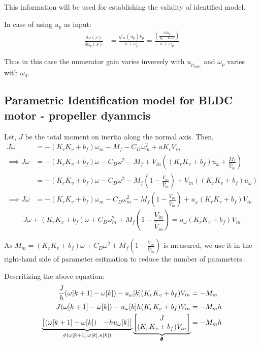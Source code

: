 This information will be used for establishing the validity of identified model.

In case of using $u_p$ as input:
\begin{align*}
    \frac{\delta \omega(s)}{\delta u_p(s)} &= \frac{g'_w (u_p) k_p}{s + \omega_p} = \frac{\left(\frac{22 k_p}{u_p - 1110}\right)}{s + \omega_p}
\end{align*}

Thus in this case the numerator gain varies inversely with $u_{p_{nom}}$ and $\omega_p$ varies with $\omega_0$.

\subsection{Parametric Identification model for BLDC motor - propeller dyanmcis}
Let, $J$ be the total moment on inertia along the normal axis. Then,
\begin{align*}
    J \dot \omega &= -(K_rK_v + b_f) \omega_m - M_f - C_D \omega_m^2 + u K_r V_{in}\\
    \implies J\dot \omega &= -(K_rK_v + b_f) \omega - C_D \omega^2 - M_f + V_{in} \left((K_r K_v  + b_f) u_\omega + \frac{M_f}{\hat V_{in}} \right)\\
        &= -(K_rK_v + b_f) \omega - C_D \omega^2 - M_f \left( 1 - \frac{V_{in}}{\hat V_{in}}\right) + V_{in} \left((K_r K_v  + b_f) u_\omega  \right)\\
    \implies J \dot \omega &= -(K_rK_v + b_f)\omega_m - C_D \omega_m^2 - M_f \left( 1 - \frac{V_{in}}{\hat V_{in}}\right) + u_\omega (K_rK_v + b_f) V_{in}
\end{align*}
$$\boxed{J \dot \omega + (K_rK_v + b_f)\omega + C_D \omega_m^2 + M_f \left( 1 - \frac{V_{in}}{\hat V_{in}}\right) =  u_\omega (K_rK_v + b_f) V_{in}}$$

As $M_m = (K_rK_v + b_f) \omega + C_D \omega^2 + M_f \left( 1 - \frac{V_{in}}{\hat V_{in}}\right) $ is measured, we use it in the right-hand side of parameter esitmation to reduce the number of parameters.

Descritizing the above equation:
\begin{align*}
    \frac{J}{h} (\omega[k+1] - \omega[k]) - u_\omega[k] (K_rK_v + b_f) V_{in} &= - M_m \\
    J(\omega[k+1] - \omega[k]) - u_\omega[k] h(K_rK_v + b_f) V_{in} &= - M_m h \\
    \underbrace{\begin{bmatrix} (\omega[k+1] - \omega[k]) & -h u_\omega[k] \end{bmatrix} }_{\phi(\omega[k+1], \omega[k], u[k])} \underbrace{\begin{bmatrix} J \\ (K_rK_v + b_f) V_{in}  \end{bmatrix}}_{\pmb \theta} &= - M_m h
\end{align*}



